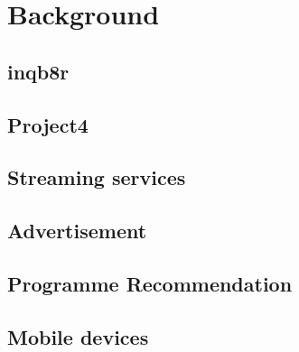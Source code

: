\section{Background}

	\subsection{inqb8r}

	\subsection{Project4}

	\subsection{Streaming services}

	\subsection{Advertisement}

	\subsection{Programme Recommendation}

	\subsection{Mobile devices}

